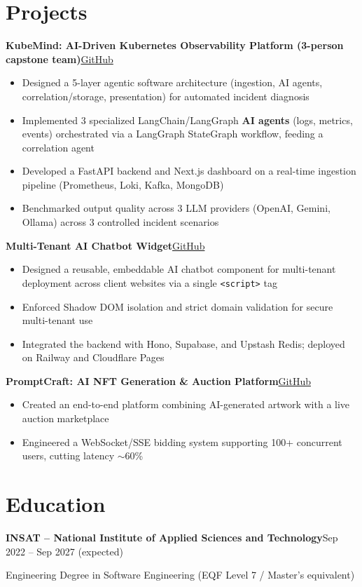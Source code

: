 \documentclass[10pt,a4paper]{article}
\newcommand{\entry}[2]{\vspace{1pt}\noindent\textbf{#1}\hfill{\color{muted}#2}\par}
\newcommand{\gh}[1]{\href{https://github.com/Hsan003/#1}{GitHub}}
\begin{document}
\section{Projects}
\entry{KubeMind: AI-Driven Kubernetes Observability Platform (3-person capstone team)}{\gh{kubemind}}
\begin{itemize}
  \item Designed a 5-layer agentic software architecture (ingestion, AI agents, correlation/storage, presentation) for automated incident diagnosis
  \item Implemented 3 specialized LangChain/LangGraph \textbf{AI agents} (logs, metrics, events) orchestrated via a LangGraph StateGraph workflow, feeding a correlation agent
  \item Developed a FastAPI backend and Next.js dashboard on a real-time ingestion pipeline (Prometheus, Loki, Kafka, MongoDB)
  \item Benchmarked output quality across 3 LLM providers (OpenAI, Gemini, Ollama) across 3 controlled incident scenarios
\end{itemize}
\entry{Multi-Tenant AI Chatbot Widget}{\gh{AI-Assistant-Backend}}
\begin{itemize}
  \item Designed a reusable, embeddable AI chatbot component for multi-tenant deployment across client websites via a single \texttt{<script>} tag
  \item Enforced Shadow DOM isolation and strict domain validation for secure multi-tenant use
  \item Integrated the backend with Hono, Supabase, and Upstash Redis; deployed on Railway and Cloudflare Pages
\end{itemize}
\entry{PromptCraft: AI NFT Generation \& Auction Platform}{\gh{prompt-craft-back}}
\begin{itemize}
  \item Created an end-to-end platform combining AI-generated artwork with a live auction marketplace
  \item Engineered a WebSocket/SSE bidding system supporting 100+ concurrent users, cutting latency $\sim$60\%
\end{itemize}

\section{Education}
\entry{INSAT -- National Institute of Applied Sciences and Technology}{Sep 2022 -- Sep 2027 (expected)}
Engineering Degree in Software Engineering (EQF Level 7 / Master's equivalent)
\end{document}
